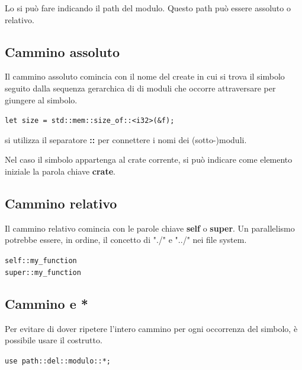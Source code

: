 Lo si può fare indicando il path del modulo. Questo path può essere
assoluto o relativo.

\subsection{Cammino assoluto}
Il cammino assoluto comincia con il nome del create in cui si trova il simbolo
seguito dalla sequenza gerarchica di di moduli che occorre attraversare per
giungere al simbolo.

\begin{center}
  \texttt{let size = std::mem::size_of::<i32>(&f);}
\end{center}

si utilizza il separatore \textbf{::} per connettere i nomi dei (sotto-)moduli.


Nel caso il simbolo appartenga al crate corrente, si può indicare come elemento
iniziale la parola chiave \textbf{crate}.

\subsection{Cammino relativo}
Il cammino relativo comincia con le parole chiave \textbf{self} o \textbf{super}.
Un parallelismo potrebbe essere, in ordine, il concetto di "./" e "../" nei file
system.

\begin{center}
  \texttt{self::my_function}\\
  \texttt{super::my_function}
\end{center}


\subsection{Cammino e *}

Per evitare di dover ripetere l'intero cammino per ogni occorrenza del simbolo,
è possibile usare il costrutto.

\begin{center}
  \texttt{use path::del::modulo::*;}
\end{center}

